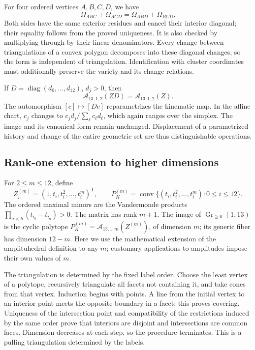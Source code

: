 For four ordered vertices \(A,B,C,D\), we have
\begin{equation}
 \Omega_{ABC}+\Omega_{ACD}=\Omega_{ABD}+\Omega_{BCD}.
 \label{eq:polygon-flip}
\end{equation}
Both sides have the same exterior residues and cancel their interior
diagonal; their equality follows from the proved uniqueness.
It is also checked by multiplying through by their linear denominators.
Every change between triangulations of a convex polygon decomposes
into these diagonal changes, so the form is independent of triangulation.
Identification with cluster coordinates must additionally preserve
the variety and its change relations.

If \(D=\operatorname{diag}(d_0,\ldots,d_{12})\), \(d_j>0\), then
\begin{equation}
 \mathcal A_{13,1,2}(ZD)=\mathcal A_{13,1,2}(Z).
 \label{eq:polygon-rescale}
\end{equation}
The automorphism \([c]\mapsto[Dc]\) reparametrizes the kinematic map.
In the affine chart, \(c_j\) changes to
\(c_jd_j/\sum_\ell c_\ell d_\ell\), which again ranges over the
simplex. The image and its canonical form remain unchanged.
Displacement of a parametrized history and change of the entire
geometric set are thus distinguishable operations.

\subsection{Rank-one extension to higher dimensions}

For \(2\leq m\leq12\), define
\begin{equation}
 Z_i^{(m)}=(1,t_i,t_i^2,\ldots,t_i^m)^\mathsf T,\qquad
 P_K^{(m)}=\operatorname{conv}
 \{(t_i,t_i^2,\ldots,t_i^m):0\leq i\leq12\}.
 \label{eq:polygon-higher-lift}
\end{equation}
The ordered maximal minors are the Vandermonde products
\(\prod_{a<b}(t_{i_b}-t_{i_a})>0\). The matrix has rank \(m+1\).
The image of \(\operatorname{Gr}_{\geq0}(1,13)\) is the cyclic
polytope \(P_K^{(m)}=\mathcal A_{13,1,m}(Z^{(m)})\), of dimension
\(m\); its generic fiber has dimension \(12-m\). Here we use the
mathematical extension of the amplituhedral definition to any \(m\);
customary applications to amplitudes impose their own values of \(m\).

The triangulation is determined by the fixed label order. Choose the
least vertex of a polytope, recursively triangulate all facets not
containing it, and take cones from that vertex. Induction begins with
points. A line from the initial vertex to an interior point meets
the opposite boundary in a facet; this proves covering. Uniqueness
of the intersection point and compatibility of the restrictions
induced by the same order prove that interiors are disjoint and
intersections are common faces. Dimension decreases at each step,
so the procedure terminates. This is a pulling triangulation
determined by the labels.

